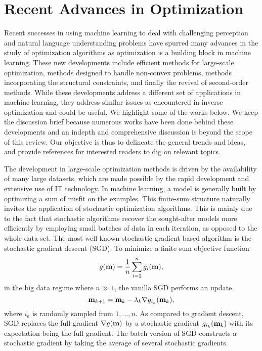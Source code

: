 \section{Recent Advances in Optimization}
\label{sec:advances}

Recent successes in using machine learning to deal with challenging perception
and natural language understanding problems have spurred many advances in the
study of optimization algorithms as optimization is a building block in machine
learning. 
These new developments include efficient methods for large-scale optimization, 
methods designed to handle non-convex problems, methods incorporating the structural
constraints, and finally the revival of second-order methods.
While these developments address a different set of applications in machine
learning, they address similar issues as encountered in inverse optimization and
could be useful.
We highlight some of the works below.
We keep the discussion brief because numerous works have been done behind these
developments and an indepth and comprehensive discussion is beyond the scope of
this review.
Our objective is thus to delineate the general trends and ideas, and provide
references for interested readers to dig on relevant topics.

\medskip{}
The development in large-scale optimization methods is driven by the
availability of many large datasets, which are made possible by the rapid
development and extensive use of IT technology. 
In machine learning, a model is generally built by optimizing a sum of misfit on
the examples.
This finite-sum structure naturally invites the application of stochastic optimization algorithms. This is mainly due to the fact that stochastic algorithms recover the sought-after models more efficiently by employing small batches of data in each iteration, as opposed to the whole data-set.
The most well-known stochastic gradient based algorithm is the stochastic gradient descent (SGD).
To minimize a finite-sum objective function 
\begin{align}
\label{eq:finite_sum}
g({\bf m}) = \frac{1}{n} \sum_{i=1}^{n} g_{i}({\bf m}),
\end{align} 
in the big data regime where $ n \gg 1 $, 
the vanilla SGD performs an update 
\begin{equation}
	{\bf m}_{k+1} = {\bf m}_{k} - \lambda_{k} \mathbf{\nabla} g_{i_{k}}({\bf m}_{k}),
\end{equation}
where $i_{k}$ is randomly sampled from $1, \ldots, n$.
As compared to gradient descent, SGD replaces the full gradient 
$\mathbf{\nabla} g({\bf m})$ by a stochastic gradient $g_{i_{k}}({\bf m}_{k})$ with its
expectation being the full gradient.
The batch version of SGD constructs a stochastic gradient by taking the average
of several stochastic gradients.

